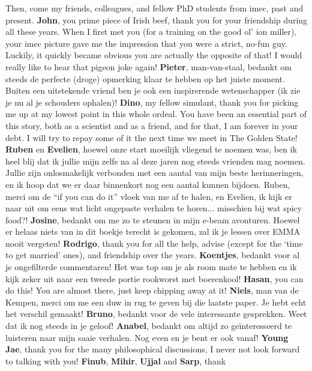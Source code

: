 Then, come my friends, colleagues, and fellow PhD students from imec, past and present. \textbf{John}, you
prime piece of Irish beef, thank you for your friendship during all these years. When I first met you (for a
training on the good ol' ion miller), your imec picture gave me the impression that you were a strict, no-fun
guy. Luckily, it quickly became obvious you are actually the opposite of that! I would really like to hear
that pigeon joke again! \textbf{Pieter}, man-van-staal, bedankt om steeds de perfecte (droge) opmerking klaar
te hebben op het juiste moment. Buiten een uitstekende vriend ben je ook een inspirerende wetenschapper (ik
zie je nu al je schouders ophalen)! \textbf{Dino}, my fellow simulant, thank you for picking me up at my
lowest point in this whole ordeal. You have been an essential part of this story, both as a scientist and as a
friend, and for that, I am forever in your debt. I will try to repay some of it the next time we meet in The
Golden State! \textbf{Ruben} en \textbf{Evelien}, hoewel onze start moeilijk vliegend te noemen was, ben ik
heel blij dat ik jullie mijn zelfs na al deze jaren nog steeds vrienden mag noemen. Jullie zijn onlosmakelijk
verbonden met een aantal van mijn beste herinneringen, en ik hoop dat we er daar binnenkort nog een aantal
kunnen bijdoen. Ruben, merci om de ``if you can do it'' vloek van me af te halen, en Evelien, ik kijk er naar
uit om eens wat licht ongepaste verhalen te horen... misschien bij wat spicy food?! \textbf{Josine}, bedankt
om me zo te steunen in mijn e-beam avonturen. Hoewel er helaas niets van in dit boekje terecht is gekomen, zal
ik je lessen over EMMA nooit vergeten! \textbf{Rodrigo}, thank you for all the help, advise (except for the
`time to get married' ones), and friendship over the years. \textbf{Koentjes}, bedankt voor al je ongefilterde
commentaren! Het was top om je als room mate te hebben en ik kijk zeker uit naar een tweede portie rookworst
met boerenkool! \textbf{Hasan}, you can do this! You are almost there, just keep chipping away at it!
\textbf{Niels}, man van de Kempen, merci om me een duw in rug te geven bij die laatste paper. Je hebt echt het
verschil gemaakt! \textbf{Bruno}, bedankt voor de vele interessante gesprekken. Weet dat ik nog steeds in je
geloof! \textbf{Anabel}, bedankt om altijd zo ge\"{i}nteresseerd te luisteren naar mijn saaie verhalen. Nog
even en je bent er ook vanaf! \textbf{Young Jae}, thank you for the many philosophical discussions, I never
not look forward to talking with you! \textbf{Finub}, \textbf{Mihir}, \textbf{Ujjal} and \textbf{Sarp}, thank
